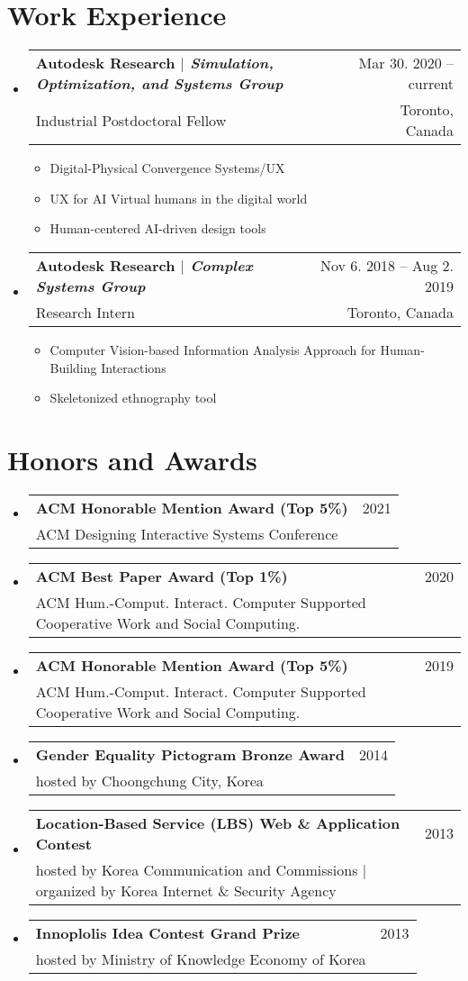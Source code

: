 \documentclass[letterpaper,11pt]{article} %
\makeatletter
\newcommand{\CVItem}[1]{
  \item\small{
    {#1 \vspace{-2pt}}
  }
}
\newcommand{\CVSubheading}[4]{
  \vspace{-2pt}\item
    \begin{tabular*}{0.97\textwidth}[t]{l@{\extracolsep{\fill}}r}
      \textbf{#1} & #2 \\
      \small#3 & \small #4 \\
    \end{tabular*}\vspace{-7pt}
}
\newcommand{\CVSubHeadingListStart}{\begin{itemize}[leftmargin=0.5cm, label={}]}
\newcommand{\CVSubHeadingListEnd}{\end{itemize}}
\newcommand{\CVItemListStart}{\begin{itemize}}
\newcommand{\CVItemListEnd}{\end{itemize}\vspace{-5pt}}
\makeatother
\begin{document}
\begin{comment}
try to briefly explain what you did and why it is relevant to the position you are seeking
\end{comment}

\section{Work Experience}
  \CVSubHeadingListStart
    \CVSubheading
      {Autodesk Research $|$ \emph{\small{Simulation, Optimization, and Systems Group}}}{Mar 30. 2020 -- current}
      {Industrial Postdoctoral Fellow}{Toronto, Canada}
      \CVItemListStart
        \CVItem{Digital-Physical Convergence Systems/UX}
        \CVItem{UX for AI Virtual humans in the digital world}
        \CVItem{Human-centered AI-driven design tools}
        
    \CVItemListEnd
    
    \CVSubheading
      {Autodesk Research $|$ \emph{\small{Complex Systems Group}}}{Nov 6. 2018 -- Aug 2. 2019}
      {Research Intern}{Toronto, Canada}
      \CVItemListStart
        \CVItem{Computer Vision-based Information Analysis Approach for Human-Building Interactions}
        \CVItem{Skeletonized ethnography tool}
      \CVItemListEnd
  \CVSubHeadingListEnd

\section{Honors and Awards}
  \CVSubHeadingListStart
    \CVSubheading
      {ACM Honorable Mention Award (Top 5\%)}{2021}
      {ACM Designing Interactive Systems Conference}{}
    \CVSubheading
      {ACM Best Paper Award (Top 1\%)}{2020}
      {ACM Hum.-Comput. Interact. Computer Supported Cooperative Work and Social Computing.}{}
    \CVSubheading
      {ACM Honorable Mention Award (Top 5\%)}{2019}
      {ACM Hum.-Comput. Interact. Computer Supported Cooperative Work and Social Computing.}{}
    \CVSubheading
      {Gender Equality Pictogram Bronze Award}{2014}
      {hosted by Choongchung City, Korea}{}
    \CVSubheading
      {Location-Based Service (LBS) Web \& Application Contest}{2013}
      {hosted by Korea Communication and Commissions $|$ organized by Korea Internet \& Security Agency}{}
    \CVSubheading
      {Innoplolis Idea Contest Grand Prize}{2013}
      {hosted by Ministry of Knowledge Economy of Korea}{}
  \CVSubHeadingListEnd
  
\end{document}
